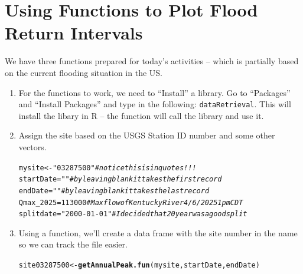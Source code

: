 \documentclass{tufte-handout}\usepackage[]{graphicx}\usepackage[]{xcolor}
\makeatletter
\newcommand{\hlnum}[1]{\textcolor[rgb]{0.686,0.059,0.569}{#1}}%
\newcommand{\hlstr}[1]{\textcolor[rgb]{0.192,0.494,0.8}{#1}}%
\newcommand{\hlcom}[1]{\textcolor[rgb]{0.678,0.584,0.686}{\textit{#1}}}%
\newcommand{\hlstd}[1]{\textcolor[rgb]{0.345,0.345,0.345}{#1}}%
\newcommand{\hlkwb}[1]{\textcolor[rgb]{0.69,0.353,0.396}{#1}}%
\newcommand{\hlkwd}[1]{\textcolor[rgb]{0.737,0.353,0.396}{\textbf{#1}}}%
\newenvironment{kframe}{%
 \def\at@end@of@kframe{}%
 \ifinner\ifhmode%
  \def\at@end@of@kframe{\end{minipage}}%
  \begin{minipage}{\columnwidth}%
 \fi\fi%
 \def\FrameCommand##1{\hskip\@totalleftmargin \hskip-\fboxsep
 \colorbox{shadecolor}{##1}\hskip-\fboxsep
     \hskip-\linewidth \hskip-\@totalleftmargin \hskip\columnwidth}%
 \MakeFramed {\advance\hsize-\width
   \@totalleftmargin\z@ \linewidth\hsize
   \@setminipage}}%
 {\par\unskip\endMakeFramed%
 \at@end@of@kframe}
\newenvironment{knitrout}{}{} %
\makeatother
\begin{document}
\clearpage
\section{Using Functions to Plot Flood Return Intervals}

We have three functions prepared for today's activities -- which is partially 
based on the current flooding situation in the US. 

\begin{enumerate}
  \item For the functions to work, we need to ``Install'' a library. Go to ``Packages'' and 
``Install Packages'' and type in the following: \texttt{dataRetrieval}.  This will install 
the libary in R -- the function will call the library and use it.

  \item Assign the site based on the USGS Station ID number and some other vectors. 

\begin{knitrout}
\color{fgcolor}\begin{kframe}
\begin{alltt}
\hlstd{mysite} \hlkwb{<-} \hlstr{"03287500"}        \hlcom{# notice this is in quotes!!!}
\hlstd{startDate} \hlkwb{=} \hlstr{""}              \hlcom{# by leaving blank it takes the first record}
\hlstd{endDate} \hlkwb{=} \hlstr{""}                \hlcom{# by leaving blank it takes the last record}
\hlstd{Qmax_2025} \hlkwb{=} \hlnum{113000}          \hlcom{# Max flow of Kentucky River 4/6/2025 1 pm CDT}
\hlstd{splitdate} \hlkwb{=} \hlstr{"2000-01-01"}    \hlcom{# I decided that 20 year was a good split}
\end{alltt}
\end{kframe}
\end{knitrout}

  \item Using a function, we'll create a data frame with the site number in the name
so we can track the file easier. 

\begin{knitrout}
\color{fgcolor}\begin{kframe}
\begin{alltt}
\hlstd{site03287500} \hlkwb{<-} \hlkwd{getAnnualPeak.fun}\hlstd{(mysite, startDate, endDate)}
\end{alltt}


{\ttfamily\noindent\itshape\color{messagecolor}{\#\# Some dates could not be converted to a valid date, and were returned as NA}}\end{kframe}
\end{knitrout}


\end{enumerate}
\end{document}
